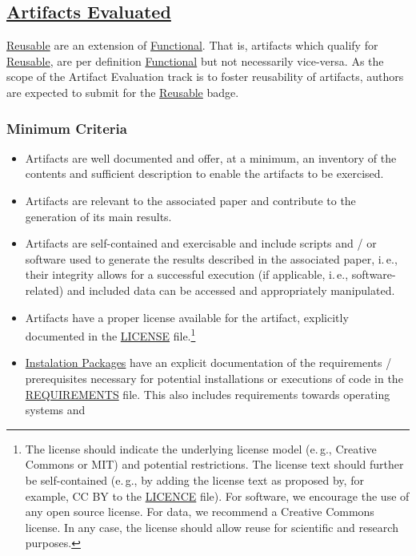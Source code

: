 \documentclass[twoside,a4paper]{refart}
\newcommand{\ie}{i.\,e.,\xspace}
\newcommand{\eg}{e.\,g.,\xspace}
\newcommand{\evaluated}{\protect\hyperlink{evaluated}{Artifacts Evaluated}\xspace}
\newcommand{\functional}{\protect\hyperlink{functional}{Functional}\xspace}
\newcommand{\reusable}{\protect\hyperlink{reusable}{Reusable}\xspace}
\newcommand{\ipackages}{\protect\hyperlink{ipackage}{Instalation Packages}\xspace}
\begin{document}
\subsection{\evaluated}

\reusable are an extension of \functional. That is, artifacts which
qualify for \reusable, are per definition \functional but not
necessarily vice-versa. As the scope of the Artifact Evaluation track
is to foster reusability of artifacts, authors are expected to submit
for the \reusable badge.

\subsubsection{Minimum Criteria}

\begin{itemize}
\item[\Checkedbox] Artifacts are well documented and offer, at a
  minimum, an inventory of the contents and sufficient description to
  enable the artifacts to be exercised.
\item[\Checkedbox] Artifacts are relevant to the associated paper and
  contribute to the generation of its main results.
\item[\Checkedbox] Artifacts are self-contained and exercisable and
  include scripts and / or software used to generate the results
  described in the associated paper, \ie their integrity allows for a
  successful execution (if applicable, \ie software-related) and
  included data can be accessed and appropriately manipulated.
\item[\Checkedbox] Artifacts have a proper license available for the
  artifact, explicitly documented in the
  \hyperlink{license}{LICENSE} file.\footnote{The license should
    indicate the underlying license model (\eg Creative Commons or
    MIT) and potential restrictions. The license text should further
    be self-contained (\eg by adding the license text as proposed by,
    for example, CC BY to the \hyperlink{license}{LICENCE} file). For
    software, we encourage the use of any open source license. For
    data, we recommend a Creative Commons license. In any case, the
    license should allow reuse for scientific and research purposes.}
\item[\Checkedbox] \ipackages have an explicit documentation of the
  requirements / prerequisites necessary for potential installations
  or executions of code in the \hyperlink{requirements}{REQUIREMENTS}
  file. This also includes requirements towards operating systems and

\end{itemize}
\end{document}
